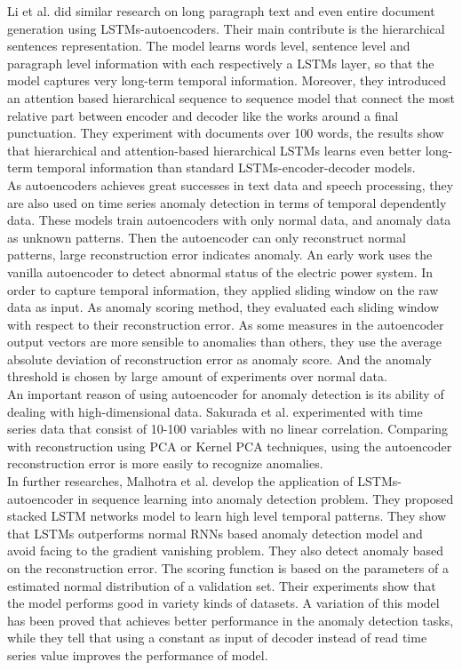 Li et al. \cite{hierarchicalseq2seq} did similar research on long paragraph text and even entire document generation using LSTMs-autoencoders. Their main contribute is the hierarchical sentences representation. The model learns words level, sentence level and paragraph level information with each respectively a LSTMs layer, so that the model captures very long-term temporal information. Moreover, they introduced an attention based hierarchical sequence to sequence model that connect the most relative part between encoder and decoder like the works around a final punctuation. They experiment with documents over 100 words, the results show that hierarchical and attention-based hierarchical LSTMs learns even better long-term temporal information than standard LSTMs-encoder-decoder models.\\

As autoencoders achieves great successes in text data and speech processing, they are also used on time series anomaly detection in terms of temporal dependently data. These models train autoencoders with only normal data, and anomaly data as unknown patterns. Then the autoencoder can only reconstruct normal patterns, large reconstruction error indicates anomaly. An early work \cite{eps} uses the vanilla autoencoder to detect abnormal status of the electric power system. In order to capture temporal information, they applied sliding window on the raw data as input. As anomaly scoring method, they evaluated each sliding window with respect to their reconstruction error. As some measures in the autoencoder output vectors are more sensible to anomalies than others, they use the average absolute deviation of reconstruction error as anomaly score. And the anomaly threshold is chosen by large amount of experiments over normal data.\\

An important reason of using autoencoder for anomaly detection is its ability of dealing with high-dimensional data. Sakurada et al. \cite{ dimensionalityreduction} experimented with time series data that consist of 10-100 variables with no linear correlation. Comparing with reconstruction using PCA or Kernel PCA techniques, using the autoencoder reconstruction error is more easily to recognize anomalies.\\

In further researches, Malhotra et al. \cite{lstmad}\cite{encdecad} develop the application of LSTMs-autoencoder in sequence learning into anomaly detection problem. They proposed stacked LSTM networks model to learn high level temporal patterns. They show that LSTMs outperforms normal RNNs based anomaly detection model and avoid facing to the gradient vanishing problem. They also detect anomaly based on the reconstruction error. The scoring function is based on the parameters of a estimated normal distribution of a validation set. Their experiments show that the model performs good in variety kinds of datasets. A variation of this model \cite{timenet} has been proved that achieves better performance in the anomaly detection tasks, while they tell that using a constant as input of decoder instead of read time series value improves the performance of model.

